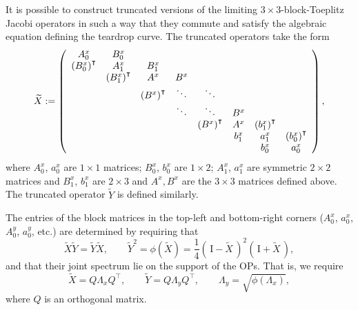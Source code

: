 \documentclass[12pt,a4paper]{article}
\begin{document}
It is possible to construct truncated versions of the limiting $3\times 3$-block-Toeplitz Jacobi operators in such a way that they commute and satisfy the algebraic equation defining the teardrop curve. The truncated operators take the form
$$
\widetilde{X} := \left(
\begin{array}{c c c c c c c c }
A_0^x  & B_0^x   &        &        & & & &   \\
\left(B_0^x \right)^{\intercal} & A_1^x  & B_1^x &       & &  & &      \\
                                &\left(B_1^x \right)^{\intercal} & A^x  &  B^x       &  &    & &     \\
                                            & & \left(B^x \right)^{\intercal}  &  \ddots        & \ddots  &  & &       \\
                                                        & &    &   \ddots      & \ddots  &B^x   & &       \\
             & &   &          & \left(B^x \right)^{\intercal}  &      A^x    & \left(b_1^x \right)^{\intercal} &  \\
                                &                        & &          &  & b_1^x   & a_1^x & \left(b_0^x \right)^{\intercal}  \\
                                &     & & & &  &  b_0^x & a_0^x
\end{array}
\right), 
$$
where $A_0^x$, $a_0^x$ are $1\times 1$ matrices; $B_0^x$, $b_0^x$ are $1 \times 2$; $A_1^x$, $a_1^x$ are symmetric $2 \times 2$ matrices and $B_1^x$, $b_1^x$ are $2 \times 3$ and $A^x, B^x$ are the $3\times 3$ matrices defined above. The truncated operator $\widetilde{Y}$ is defined similarly. 

The entries of the block matrices in the top-left and bottom-right corners ($A_0^x$, $a_0^x$, $A_0^y$, $a_0^y$, etc.) are determined by requiring that
\begin{equation}
\widetilde{X}\widetilde{Y} = \widetilde{Y}\widetilde{X}, \qquad \widetilde{Y}^2 = \phi( \widetilde{X} ) =  \frac{1}{4}\left(\,\mathrm{I} - \widetilde{X} \,\right)^2 \left(\,\mathrm{I} + \widetilde{X} \,\right), \label{eq:opalgebra}
\end{equation}
and that their joint spectrum lie on the support of the OPs. That is, we require 
\begin{equation}
\widetilde{X} = Q\Lambda_xQ^{\intercal}, \qquad 
\widetilde{Y} = Q\Lambda_yQ^{\intercal}, \qquad
\Lambda_y = \sqrt{\phi(\Lambda_x)}, \label{eq:opspectrum}
\end{equation}
where $Q$ is an orthogonal matrix.
\end{document}
